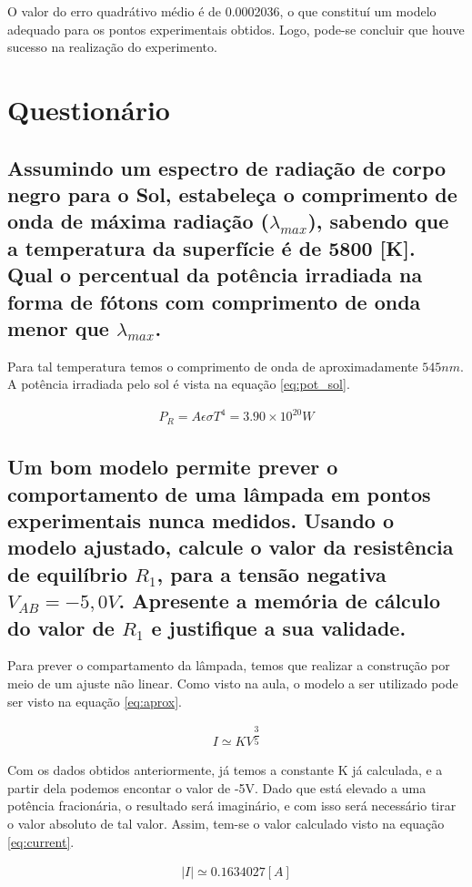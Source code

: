 \documentclass[12pt]{IEEEtran}
\begin{document}
O valor do erro quadrátivo médio é de 0.0002036, o que constituí um modelo adequado para os pontos experimentais obtidos. Logo, pode-se concluir que houve sucesso na realização do experimento.

\section{Questionário}

\subsection{Assumindo um espectro de radiação de corpo negro para o Sol, estabeleça o comprimento de onda de máxima radiação ($\lambda_{max}$), sabendo que a temperatura da superfície é de 5800 [K]. Qual o percentual da potência irradiada na forma de fótons com comprimento de onda menor que $\lambda_{max}$.}

Para tal temperatura temos o comprimento de onda de aproximadamente $545 nm$. A potência irradiada pelo sol é vista na equação \ref{eq:pot_sol}.

\begin{gather}\label{eq:pot_sol}
  P_R = A\epsilon \sigma T^4 = 3.90\times 10^{20} W
\end{gather}


\subsection{Um bom modelo permite prever o comportamento de uma lâmpada em pontos experimentais nunca medidos. Usando o modelo ajustado, calcule o valor da resistência de equilíbrio $R_1$, para a tensão negativa $V_{AB}=-5,0V$. Apresente a memória de cálculo do valor de $R_1$ e justifique a sua validade.}


Para prever o compartamento da lâmpada, temos que realizar a construção por meio de um ajuste não linear. Como visto na aula, o modelo a ser utilizado pode ser visto na equação \ref{eq:aprox}.

\begin{gather}\label{eq:aprox}
  I \simeq KV^{\dfrac{3}{5} }
\end{gather}

Com os dados obtidos anteriormente, já temos a constante K já calculada, e a partir dela podemos encontar o valor de -5V. Dado que está elevado a uma potência fracionária, o resultado será imaginário, e com isso será necessário tirar o valor absoluto de tal valor. Assim, tem-se o valor calculado visto na equação \ref{eq:current}.

\begin{gather}\label{eq:current}
  |I| \simeq  0.1634027 [A]
\end{gather}
\end{document}
